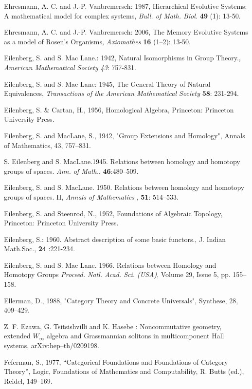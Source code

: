 \documentclass[12pt]{article}
\begin{document}
\begin{thebibliography}{399}
Ehresmann, A. C. and J.-P. Vanbremersch: 1987, Hierarchical
Evolutive Systems: A mathematical model for complex systems,
\emph{Bull. of Math. Biol.} \textbf{49} (1): 13-50.

Ehresmann, A. C. and J.-P. Vanbremersch: 2006, The Memory Evolutive Systems as
a model of Rosen's Organisms, \emph{Axiomathes} \textbf{16} (1--2): 13-50.

Eilenberg, S. and S. Mac Lane.: 1942, Natural Isomorphisms in Group Theory., \emph{American Mathematical Society 43}: 757-831.

Eilenberg, S. and S. Mac Lane: 1945, The General Theory of Natural Equivalences, \emph{Transactions of the American Mathematical Society} \textbf{58}: 231-294.

Eilenberg, S. \& Cartan, H., 1956, Homological Algebra, Princeton: Princeton University Press. 

Eilenberg, S. and MacLane, S., 1942, "Group Extensions and Homology", Annals of Mathematics, 43, 757--831. 


S. Eilenberg and S. MacLane.1945. Relations between homology
and homotopy groups of spaces. {\em Ann. of Math.}, \textbf{46}:480--509.

Eilenberg, S. and S. MacLane. 1950. Relations between homology and homotopy groups of spaces. II,
{\em Annals of Mathematics} , \textbf{51}: 514--533.

Eilenberg, S. and Steenrod, N., 1952, Foundations of Algebraic Topology, Princeton: Princeton University Press. 

Eilenberg, S.: 1960. Abstract description of some basic functors., J. Indian Math.Soc., \textbf{24} :221-234.


Eilenberg, S. and S. Mac Lane. 1966. Relations between Homology and Homotopy Groups
{\em Proceed. Natl. Acad. Sci. (USA)}, Volume 29, Issue 5, pp. 155--158.  

Ellerman, D., 1988, "Category Theory and Concrete Universals", Synthese, 28, 409--429. 

Z. F. Ezawa, G. Tsitsishvilli and K. Hasebe : Noncommutative
geometry, extended $W_{\infty}$ algebra and Grassmannian solitons
in multicomponent Hall systems, arXiv:hep--th/0209198.

Feferman, S., 1977, ``Categorical Foundations and Foundations of Category Theory'', Logic, Foundations of Mathematics and Computability, R. Butts (ed.), Reidel, 149--169.


\end{thebibliography}
\end{document}
